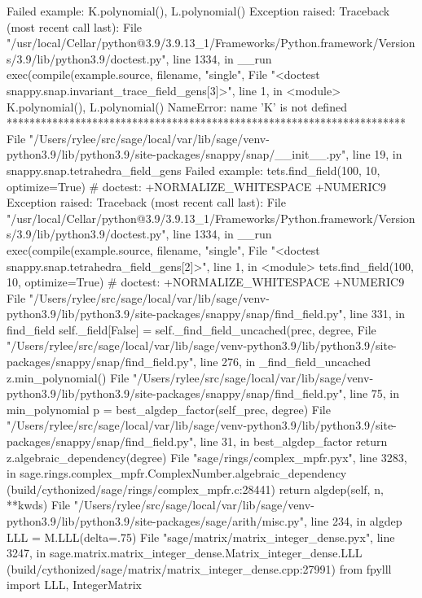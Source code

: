 Failed example:
    K.polynomial(), L.polynomial()
Exception raised:
    Traceback (most recent call last):
      File "/usr/local/Cellar/python@3.9/3.9.13_1/Frameworks/Python.framework/Versions/3.9/lib/python3.9/doctest.py", line 1334, in __run
        exec(compile(example.source, filename, "single",
      File "<doctest snappy.snap.invariant_trace_field_gens[3]>", line 1, in <module>
        K.polynomial(), L.polynomial()
    NameError: name 'K' is not defined
**********************************************************************
File "/Users/rylee/src/sage/local/var/lib/sage/venv-python3.9/lib/python3.9/site-packages/snappy/snap/__init__.py", line 19, in snappy.snap.tetrahedra_field_gens
Failed example:
    tets.find_field(100, 10, optimize=True)    # doctest: +NORMALIZE_WHITESPACE +NUMERIC9
Exception raised:
    Traceback (most recent call last):
      File "/usr/local/Cellar/python@3.9/3.9.13_1/Frameworks/Python.framework/Versions/3.9/lib/python3.9/doctest.py", line 1334, in __run
        exec(compile(example.source, filename, "single",
      File "<doctest snappy.snap.tetrahedra_field_gens[2]>", line 1, in <module>
        tets.find_field(100, 10, optimize=True)    # doctest: +NORMALIZE_WHITESPACE +NUMERIC9
      File "/Users/rylee/src/sage/local/var/lib/sage/venv-python3.9/lib/python3.9/site-packages/snappy/snap/find_field.py", line 331, in find_field
        self._field[False] = self._find_field_uncached(prec, degree,
      File "/Users/rylee/src/sage/local/var/lib/sage/venv-python3.9/lib/python3.9/site-packages/snappy/snap/find_field.py", line 276, in _find_field_uncached
        z.min_polynomial()
      File "/Users/rylee/src/sage/local/var/lib/sage/venv-python3.9/lib/python3.9/site-packages/snappy/snap/find_field.py", line 75, in min_polynomial
        p = best_algdep_factor(self_prec, degree)
      File "/Users/rylee/src/sage/local/var/lib/sage/venv-python3.9/lib/python3.9/site-packages/snappy/snap/find_field.py", line 31, in best_algdep_factor
        return z.algebraic_dependency(degree)
      File "sage/rings/complex_mpfr.pyx", line 3283, in sage.rings.complex_mpfr.ComplexNumber.algebraic_dependency (build/cythonized/sage/rings/complex_mpfr.c:28441)
        return algdep(self, n, **kwds)
      File "/Users/rylee/src/sage/local/var/lib/sage/venv-python3.9/lib/python3.9/site-packages/sage/arith/misc.py", line 234, in algdep
        LLL = M.LLL(delta=.75)
      File "sage/matrix/matrix_integer_dense.pyx", line 3247, in sage.matrix.matrix_integer_dense.Matrix_integer_dense.LLL (build/cythonized/sage/matrix/matrix_integer_dense.cpp:27991)
        from fpylll import LLL, IntegerMatrix
